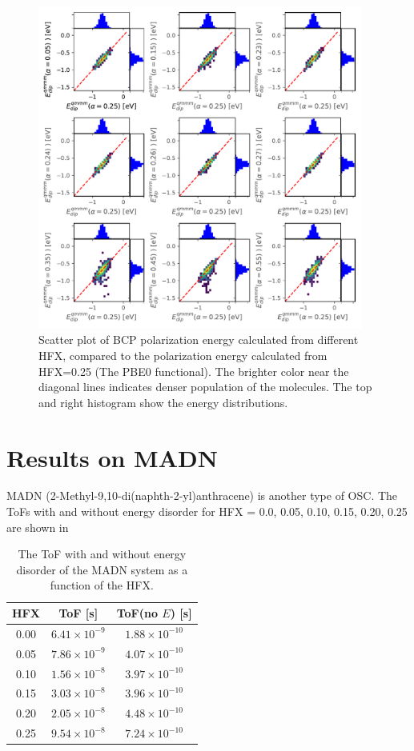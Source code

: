 \documentclass[letterpaper,12pt]{article}
\begin{document}
\begin{figure}[H]
    \centering
    \includegraphics[width=0.95\textwidth]{figs/BCP_HFX/scatterEdip_qmmm.pdf}
    \caption{Scatter plot of BCP polarization energy calculated from different HFX, compared to the polarization energy calculated from HFX=0.25 (The PBE0 functional). The brighter color near the diagonal lines indicates denser population of the molecules.  The top and right histogram show the energy distributions.}
    \label{fig:Edip_qmmm_BCP}
\end{figure}

\section{Results on MADN}
MADN (2-Methyl-9,10-di(naphth-2-yl)anthracene) is another type of OSC. 
The ToFs with and without energy disorder for HFX = 0.0, 0.05, 0.10, 0.15, 0.20, 0.25 are shown in 
\begin{table}[H]
    \centering
    \begin{tabular}{c c c }
    \hline
        HFX & ToF [s] & ToF(no $E$) [s] \\
    \hline
        0.00 &  $6.41 \times 10^{-9}$ & $1.88 \times 10^{-10}$ \\
        0.05 & $ 7.86 \times 10^{-9}$ & $4.07 \times 10^{-10}$  \\
        0.10 & $ 1.56 \times 10^{-8}$ & $3.97 \times 10^{-10} $  \\
        0.15 & $ 3.03 \times 10^{-8}$ & $3.96 \times 10^{-10} $ \\
        0.20 & $ 2.05 \times 10^{-8}$ & $4.48 \times 10^{-10}$  \\
        0.25 & $ 9.54 \times 10^{-8}$ & $7.24 \times 10^{-10}$ \\
    \hline
    \end{tabular}
    \caption{The ToF with and without energy disorder of the MADN system as a function of the HFX. }
    \label{tab:ToF_MADN_HFX}
\end{table}
\end{document}
